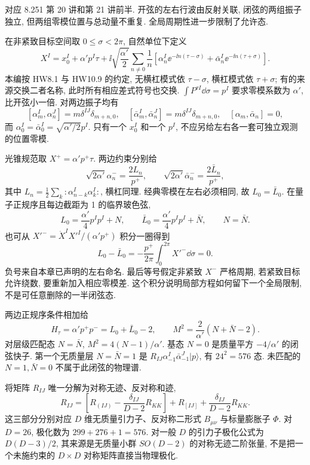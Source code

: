 \label{ch:basic-closed}
对应 8.251 第 20 讲和第 21 讲前半. 开弦的左右行波由反射关联, 闭弦的两组振子独立, 但两组零模位置与总动量不重复. 全局周期性进一步限制了允许态.

在非紧致目标空间取 $0\leq\sigma<2\pi$, 自然单位下定义
\[
 X^I=x_0^I+\alpha'p^I\tau+
 \ii\sqrt{\frac{\alpha'}2}\sum_{n\ne0}\frac1n
 [\alpha_n^I\ee^{-\ii n(\tau-\sigma)}
 +\bar\alpha_n^I\ee^{-\ii n(\tau+\sigma)}].
\]
本编按 HW8.1 与 HW10.9 的约定, 无横杠模式依 $\tau-\sigma$, 横杠模式依 $\tau+\sigma$; 有的来源交换二者名称, 此时所有相应差式符号也交换. $\int P^{\tau I}\dd\sigma=p^I$ 要求零模系数为 $\alpha'$, 比开弦小一倍. 对两边振子均有
\[
 [\alpha_m^I,\alpha_n^J]=m\delta^{IJ}\delta_{m+n,0},
 \quad[\bar\alpha_m^I,\bar\alpha_n^J]=m\delta^{IJ}\delta_{m+n,0},
 \quad[\alpha_m,\bar\alpha_n]=0,
\]
而 $\alpha_0^I=\bar\alpha_0^I=\sqrt{\alpha'/2}p^I$. 只有一个 $x_0^I$ 和一个 $p^I$, 不应另给左右各一套可独立观测的位置零模.

光锥规范取 $X^+=\alpha'p^+\tau$. 两边约束分别给
\[
 \sqrt{2\alpha'}\alpha_n^-=\frac{2L_n}{p^+},
 \qquad\sqrt{2\alpha'}\bar\alpha_n^-=\frac{2\bar L_n}{p^+},
\]
其中 $L_n=\frac12\sum_k:\alpha_{n-k}^I\alpha_k^I:$, 横杠同理.
经典零模在左右必须相同, 故 $L_0=\bar L_0$. 在量子正规序且每边截距为 1 的临界玻色弦,
\[
 L_0=\frac{\alpha'}4p^Ip^I+N,\qquad
 \bar L_0=\frac{\alpha'}4p^Ip^I+\bar N,
 \qquad N=\bar N.
\]
也可从 $X'^-=\dot X^IX'^I/(\alpha'p^+)$ 积分一圈得到
\[
 L_0-\bar L_0=-\frac{p^+}{2\pi}\int_0^{2\pi}X'^-\dd\sigma=0.
\]
负号来自本章已声明的左右命名. 最后等号假定非紧致 $X^-$ 严格周期, 若紧致目标允许绕数, 要重新加入相应零模差. 这个积分说明局部方程如何留下一个全局限制, 不是可任意删除的一半闭弦态.

两边正规序条件相加给
\[
 H_\tau=\alpha'p^+p^-=L_0+\bar L_0-2,
 \qquad M^2=\frac2{\alpha'}(N+\bar N-2).
\]
对层级匹配态 $N=\bar N$, $M^2=4(N-1)/\alpha'$. 基态 $N=0$ 是质量平方 $-4/\alpha'$ 的闭弦快子. 第一个无质量层 $N=\bar N=1$ 是
$R_{IJ}\alpha_{-1}^I\bar\alpha_{-1}^J|p\rangle$, 有 $24^2=576$ 态. 未匹配的 $N=1,\bar N=0$ 不属于此闭弦的物理谱.

将矩阵 $R_{IJ}$ 唯一分解为对称无迹、反对称和迹,
\[
 R_{IJ}=\left[R_{(IJ)}-\frac{\delta_{IJ}}{D-2}R_{KK}\right]
 +R_{[IJ]}+\frac{\delta_{IJ}}{D-2}R_{KK}.
\]
这三部分分别对应 $D$ 维无质量引力子、反对称二形式 $B_{\mu\nu}$ 与标量膨胀子 $\Phi$. 对 $D=26$, 极化数为 $299+276+1=576$. 对一般 $D$ 的引力子极化公式为 $D(D-3)/2$, 其来源是无质量小群 $SO(D-2)$ 的对称无迹二阶张量, 不是把一个未施约束的 $D\times D$ 对称矩阵直接当物理极化.


